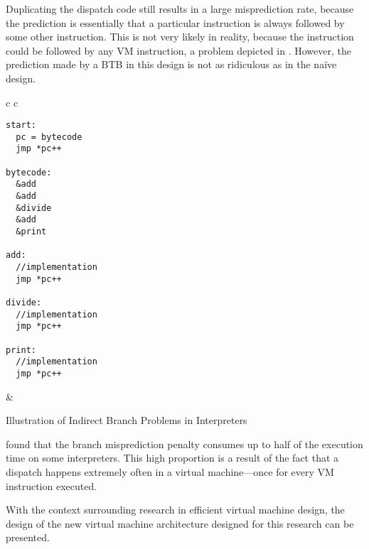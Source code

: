 		Duplicating the dispatch code still results in a large misprediction rate, because the prediction is essentially that a particular instruction is always followed by some other instruction. This is not very likely in reality, because the instruction could be followed by any VM instruction, a problem depicted in . However, the prediction made by a BTB in this design is not as ridiculous as in the naïve design.
		
		\begin{myfigure}
			\begin{tabular}{c c}
				{
				\begin{lstlisting}
start:
  pc = bytecode
  jmp *pc++

bytecode:
  &add
  &add
  &divide
  &add
  &print

add:
  //implementation
  jmp *pc++

divide:
  //implementation
  jmp *pc++

print:
  //implementation
  jmp *pc++
				\end{lstlisting}
			} & 
			{
				\hspace{-9em}
			}
			\end{tabular}
			\caption{Illustration of Indirect Branch Problems in Interpreters}
			\label{fig:interpreterbtb}
		\end{myfigure}
		
		\cite{structureinterpreters} found that the branch misprediction penalty consumes up to half of the execution time on some interpreters. This high proportion is a result of the fact that a dispatch happens extremely often in a virtual machine---once for every VM instruction executed.
		
		With the context surrounding research in efficient virtual machine design, the design of the new virtual machine architecture designed for this research can be presented.
		
